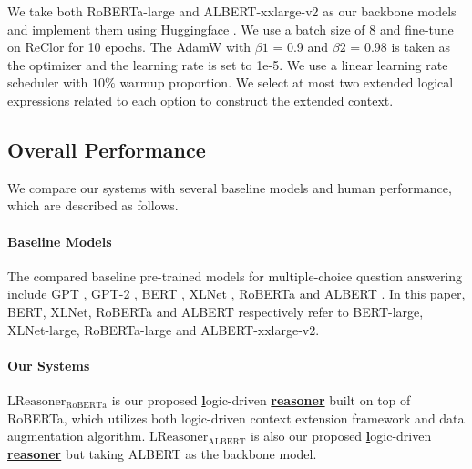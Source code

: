 \documentclass[11pt,a4paper]{article}
\begin{document}
We take both RoBERTa-large \cite{liu2019roberta} and ALBERT-xxlarge-v2 \cite{lan2019albert} as our backbone models and implement them using Huggingface \cite{wolf2019huggingface}. We use a batch size of 8 and fine-tune on ReClor for 10 epochs. The AdamW \cite{loshchilov2018fixing} with $\beta1$ = 0.9 and $\beta2$ = 0.98 is taken as the optimizer and the learning rate is set to 1e-5. We use a linear learning rate scheduler with $10\%$ warmup proportion.
We select at most two extended logical expressions related to each option to construct the extended context. 


\subsection{Overall Performance}
We compare our systems with several baseline models and human performance, which are described as follows.
\paragraph{Baseline Models} The compared baseline pre-trained models for multiple-choice question answering include GPT \cite{radford2018improving}, GPT-2 \cite{radford2019language}, BERT \cite{devlin2019bert}, XLNet \cite{yang2019xlnet}, RoBERTa \cite{liu2019roberta} and ALBERT \cite{lan2019albert}. In this paper, BERT, XLNet, RoBERTa and ALBERT respectively refer to BERT-large, XLNet-large, RoBERTa-large and ALBERT-xxlarge-v2.
\paragraph{Our Systems} \emph{$\text{LReasoner}_{\text{RoBERTa}}$} is our proposed \underline{\bf l}ogic-driven \underline{\bf reasoner} built on top of RoBERTa, which utilizes both logic-driven context extension framework and data augmentation algorithm. \emph{$\text{LReasoner}_{\text{ALBERT}}$} is also our proposed \underline{\bf l}ogic-driven \underline{\bf reasoner} but taking ALBERT as the backbone model. 
\end{document}
